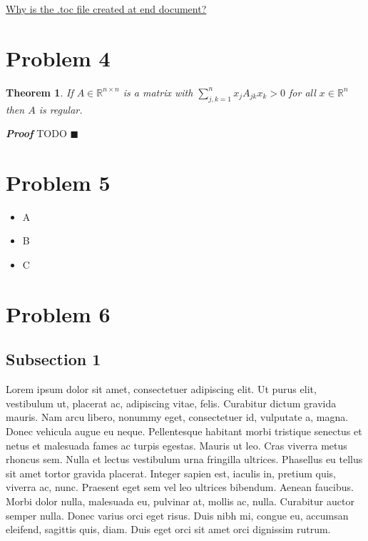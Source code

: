 \documentclass[12pt]{article}
\newtheorem{theorem}{Theorem}
\newenvironment{proof}{\textit{\textbf{Proof}}}{\hfill$\blacksquare$}
\newenvironment{myitemize}{%
	\begin{itemize}[label=$\spadesuit$]
		\let\olditem\item
		\renewcommand\item{\olditem}
	}{
	\end{itemize}
}
\begin{document}
\href{https://tex.stackexchange.com/questions/186674/why-is-the-toc-file-created-at-end-document}{Why is the .toc file created at end document?}

\section{Problem 4}
\begin{theorem}
	If $A \in \mathbb{R}^{n \times n}$ is a matrix with $\sum_{j,k=1}^{n}x_j A_{jk} x_k > 0$ for all $x \in \mathbb{R}^n$ then $A$ is regular.
\end{theorem}

\begin{proof}
	TODO
\end{proof}

\section{Problem 5}
\begin{myitemize}
	\item A
	\item B
	\item C
\end{myitemize}

\section{Problem 6}
\subsection{Subsection 1}
Lorem ipsum dolor sit amet, consectetuer
adipiscing elit. Ut purus elit, vestibulum ut, placerat ac,
adipiscing vitae, felis. Curabitur dictum gravida mauris. Nam arcu
libero, nonummy eget, consectetuer id, vulputate a, magna. Donec
vehicula augue eu neque. Pellentesque habitant morbi tristique
senectus et netus et malesuada fames ac turpis egestas. Mauris ut
leo. Cras viverra metus rhoncus sem. Nulla et lectus vestibulum urna
fringilla ultrices.  Phasellus eu tellus sit amet tortor gravida
placerat. Integer sapien est, iaculis in, pretium quis, viverra ac,
nunc. Praesent eget sem vel leo ultrices bibendum. Aenean faucibus.
Morbi dolor nulla, malesuada eu, pulvinar at, mollis ac, nulla.
Curabitur auctor semper nulla. Donec varius orci eget risus. Duis
nibh mi, congue eu, accumsan eleifend, sagittis quis, diam. Duis
eget orci sit amet orci dignissim rutrum.
\end{document}
